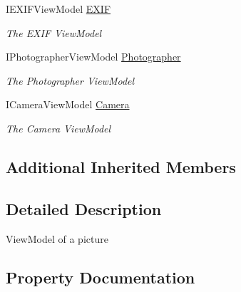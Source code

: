 \begin{DoxyCompactItemize}
I\+E\+X\+I\+F\+View\+Model \mbox{\hyperlink{class_pic_d_b_1_1_models_1_1_picture_view_model_abc0d80a7174f8d082b82c869eaa8170d}{E\+X\+IF}}
\begin{DoxyCompactList}\small\item\em The E\+X\+IF View\+Model \end{DoxyCompactList}\item 
I\+Photographer\+View\+Model \mbox{\hyperlink{class_pic_d_b_1_1_models_1_1_picture_view_model_aa42509aa5e13c40104f2ff73de1a0d81}{Photographer}}
\begin{DoxyCompactList}\small\item\em The Photographer View\+Model \end{DoxyCompactList}\item 
I\+Camera\+View\+Model \mbox{\hyperlink{class_pic_d_b_1_1_models_1_1_picture_view_model_ab2a1b1a4567b2aab22ba7f45ca8e5d8c}{Camera}}
\begin{DoxyCompactList}\small\item\em The Camera View\+Model \end{DoxyCompactList}\end{DoxyCompactItemize}
\subsection*{Additional Inherited Members}


\subsection{Detailed Description}
View\+Model of a picture 



\subsection{Property Documentation}
\mbox{\label{class_pic_d_b_1_1_models_1_1_picture_view_model_ab2a1b1a4567b2aab22ba7f45ca8e5d8c}} 
